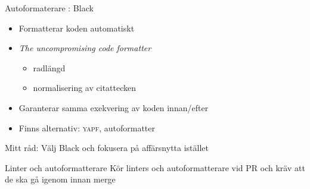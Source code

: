 \begin{frame}{Autoformaterare : Black}
  \begin{itemize}
    \item Formatterar koden automatiskt
    \item \textit{The uncompromising code formatter}
      \begin{itemize}
        \item radlängd
        \item normalisering av citattecken
      \end{itemize}
    \item Garanterar samma exekvering av koden innan/efter
    \item Finns alternativ: \textsc{yapf}, autoformatter
  \end{itemize}

  Mitt råd: Välj Black och fokusera på affärsnytta istället
\end{frame}

\begin{frame}[standout]{Linter och autoformatterare}
  Kör linters och autoformatterare vid PR och kräv att de ska gå igenom innan merge
\end{frame}

